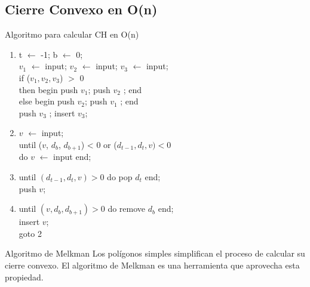 \documentclass[aspectratio=169,xcolor=dvipsnames, t]{beamer}
\begin{document}
\begin{frame}{}
\begin{columns}
\begin{column}{0.45\textwidth}
\begin{figure}
      \end{figure}
    \end{column}
  \end{columns}
\end{frame}

\subsection{Cierre Convexo en O(n)}
\begin{frame}{Algoritmo para calcular CH en O(n)}
  \begin{center}
    \begin{enumerate}
      \footnotesize
    \item t $\leftarrow$ -1; b $\leftarrow$ 0;\\
      $v_{1}$ $\leftarrow$ input; $v_{2}$ $\leftarrow$ input; $v_{3}$ $\leftarrow$ input;\\
      if ($v_{1}, v_{2}, v_{3}$) $>$ 0\\
      \hspace*{0.5cm} then begin push $v_{1}$; push $v_{2}$ ; end \\
      \hspace*{0.5cm} else begin push $v_{2}$; push $v_{1}$ ; end \\
      push $v_{3}$ ; insert $v_{3}$; 
    \item $v$ $\leftarrow$ input;\\
      until ($v$, $d_{b}$, $d_{b+1}$) < 0 or ($d_{t-1}, d_{t}, v) < 0$ \\
      \hspace*{0.5cm} do $v$ $\leftarrow$ input end;  
    \item until $(d_{t-1}, d_{t}, v) > 0$ do pop $d_{t}$ end;\\
      push $v$;
    \item until $(v, d_{b}, d_{b+1}) > 0$ do remove $d_{b}$ end;\\ 
      insert $v$; \\
      goto 2\\
    \end{enumerate}
  \end{center}
\end{frame}
\begin{frame}{Algoritmo de Melkman}
  Los polígonos simples simplifican el proceso de calcular su cierre convexo. El algoritmo de Melkman es una herramienta que aprovecha esta propiedad.
\end{frame}
\end{document}

